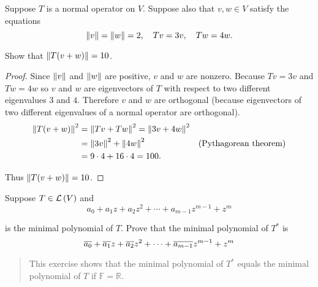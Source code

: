\begin{exercise}
    Suppose $T$ is a normal operator on $V$. Suppose also that $v, w \in V$ satisfy the equations
    \[
        \left\Vert{v}\right\Vert = \left\Vert{w}\right\Vert = 2,\quad Tv = 3v,\quad Tw = 4w.
    \]

    Show that $\left\Vert{T(v + w)}\right\Vert = 10$.
\end{exercise}

\begin{proof}
    Since $\left\Vert{v}\right\Vert$ and $\left\Vert{w}\right\Vert$ are positive, $v$ and $w$ are nonzero. Because $Tv = 3v$ and $Tw = 4w$ so $v$ and $w$ are eigenvectors of $T$ with respect to two different eigenvalues $3$ and $4$. Therefore $v$ and $w$ are orthogonal (because eigenvectors of two different eigenvalues of a normal operator are orthogonal).
    \begin{align*}
        \left\Vert{T(v + w)}\right\Vert^{2} & = \left\Vert{Tv + Tw}\right\Vert^{2} = \left\Vert{3v + 4w}\right\Vert^{2}                                \\
                            & = \left\Vert{3v}\right\Vert^{2} + \left\Vert{4w}\right\Vert^{2}           & \text{(Pythagorean theorem)} \\
                            & = 9\cdot 4 + 16\cdot 4 = 100.
    \end{align*}

    Thus $\left\Vert{T(v + w)}\right\Vert = 10$.
\end{proof}
\newpage

\begin{exercise}\label{chapter7:sectionA:exercise24}
    Suppose $T\in\mathcal{L}\left({V}\right)$ and
    \[
        a_{0} + a_{1}z + a_{2}z^{2} + \cdots + a_{m-1}z^{m-1} + z^{m}
    \]

    is the minimal polynomial of $T$. Prove that the minimal polynomial of $T^{*}$ is
    \[
        \overline{a_{0}} + \overline{a_{1}}z + \overline{a_{2}}z^{2} + \cdots + \overline{a_{m-1}}z^{m-1} + z^{m}
    \]
\end{exercise}

\begin{quote}
    This exercise shows that the minimal polynomial of $T^{*}$ equals the minimal polynomial of $T$ if $\mathbb{F} = \mathbb{R}$.
\end{quote}

